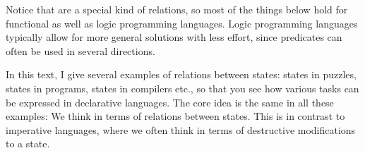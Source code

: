 Notice that  are a special kind of relations, so most of the
things below hold for functional as well as logic programming languages. Logic
programming languages typically allow for more general solutions with less
effort, since predicates can often be used in several directions.

In this text, I give several examples of relations between states: states in
puzzles, states in programs, states in compilers etc., so that you see how
various tasks can be expressed in declarative languages. The core idea is the
same in all these examples: We think in terms of relations between states. This
is in contrast to imperative languages, where we often think in terms of
destructive modifications to a state.
